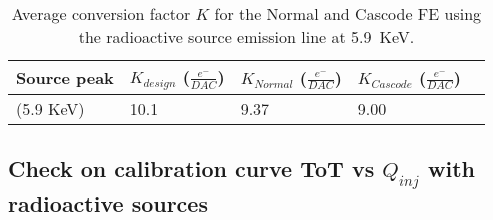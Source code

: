 \begin{table}[h!]
\centering
\begin{tabular}{>{} C{2.8cm}|C{1.7cm}|C{1.8cm}|C{1.7cm}|C{1.7cm}}
Source peak & $K_{design}$ ($\frac{e^{-}}{DAC}$) & $K_{Normal}$ ($\frac{e^{-}}{DAC}$) & $K_{Cascode}$ ($\frac{e^{-}}{DAC}$)\\[2.5ex]
\hline
{} (5.9 KeV) & 10.1  & 9.37 & 9.00\\[1ex]
\hline
\end{tabular}
\caption{Average conversion factor $K$ for the Normal and Cascode FE using the  radioactive source emission line at \SI{5.9}{KeV}.}
\label{tab:cap_mean}
\end{table}

\begin{comment}
\begin{figure}
\centering
\subfigure[\textbf{Normal}]
{\texttt{[image: k\_maps\_Normal]}}\quad
\subfigure[\textbf{Cascode}]
{\texttt{[image: k\_maps\_Cascode]}}\\
\subfigure[\textbf{All}]
{\texttt{[image: k\_maps]}}\\
\caption{???}
\label{fig:k_map}
\end{figure} 
\end{comment}







\subsection{Check on calibration curve ToT vs $Q_{inj}$ with radioactive sources}

